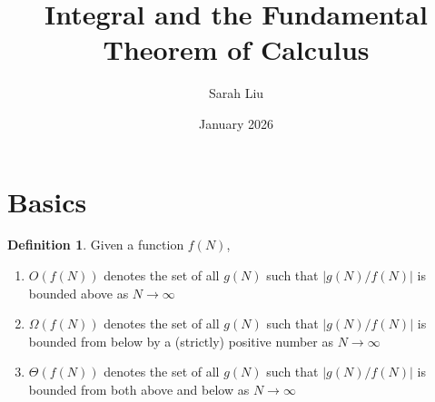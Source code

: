 \documentclass{article}
\title{Integral and the Fundamental Theorem of Calculus}
\author{Sarah Liu}
\date{January 2026}
\theoremstyle{definition}
\newtheorem{definition}[theorem]{Definition}
\theoremstyle{remark}
\begin{document}
\maketitle

\section{Basics}
\begin{definition}
    Given a function $f(N)$,
    \begin{enumerate}
        \item $O(f(N))$ denotes the set of all $g(N)$ such that $|g(N)/f(N)|$ is bounded above as $N\rightarrow\infty$
        \item $\Omega(f(N))$ denotes the set of all $g(N)$ such that $|g(N)/f(N)|$ is bounded from below by a (strictly) positive number as $N\rightarrow\infty$
        \item $\Theta(f(N))$ denotes the set of all $g(N)$ such that $|g(N)/f(N)|$ is bounded from both above and below as $N\rightarrow\infty$
    \end{enumerate}
\end{definition}
\end{document}
